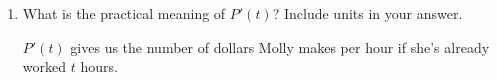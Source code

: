 \documentclass{article}
\begin{document}
\begin{enumerate}
\begin{enumerate}
\begin{solution}

      Notice the holes in the graph. These holes occur at
      points where the graph does not have a defined slope.  
    \end{solution}    

  \item
    \begin{problem}[0.5in]
      What is the practical meaning of $P'(t)$? Include units in your
      answer.
    \end{problem}

    \begin{solution}
      $P'(t)$ gives us the number of dollars Molly makes
      per hour if she's already worked $t$ hours.
    \end{solution}

  \end{enumerate}

\end{enumerate}
\end{document}
